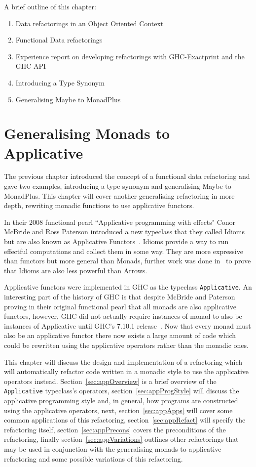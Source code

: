 A brief outline of this chapter:

\begin{enumerate}
\item Data refactorings in an Object Oriented Context
\item Functional Data refactorings
\item Experience report on developing refactorings with GHC-Exactprint and the GHC API
\item Introducing a Type Synonym
\item Generalising Maybe to MonadPlus
\end{enumerate}

\chapter{Generalising Monads to Applicative}
\label{applicative}
The previous chapter introduced the concept of a functional data refactoring and gave two examples, introducing a type synonym and generalising Maybe to MonadPlus. This chapter will cover another generalising refactoring in more depth, rewriting monadic functions to use applicative functors. 

In their 2008 functional pearl ``Applicative programming with effects" Conor McBride and Ross Paterson introduced a new typeclass that they called Idioms but are also known as Applicative Functors~\citep{mcbrideIdioms}. Idioms provide a way to run effectful computations and collect them in some way. They are more expressive than functors but more general than Monads, further work was done in~\citep{arrowsAndIdioms} to prove that Idioms are also less powerful than Arrows.

Applicative functors were implemented in GHC as the typeclass \texttt{Applicative}. An interesting part of the history of GHC is that despite McBride and Paterson proving in their original functional pearl that all monads are also applicative functors, however,  GHC did not actually require instances of monad to also be instances of Applicative until GHC's 7.10.1 release~\citep{ghc7.10Release}. Now that every monad must also be an applicative functor there now exists a large amount of code which could be rewritten using the applicative operators rather than the monadic ones. 

This chapter will discuss the design and implementation of a refactoring which will automatically refactor code written in a monadic style to use the applicative operators instead. Section~\ref{sec:appOverview} is a brief overview of the \texttt{Applicative} typeclass's operators, section~\ref{sec:appProgStyle} will discuss the applicative programming style and, in general, how programs are constructed using the applicative operators, next, section~\ref{sec:appApps} will cover some common applications of this refactoring, section~\ref{sec:appRefact} will specify the refactoring itself, section~\ref{sec:appPrecons} covers the preconditions of the refactoring, finally section~\ref{sec:appVariations} outlines other refactorings that may be used in conjunction with the generalising monads to applicative refactoring and some possible variations of this refactoring. 

